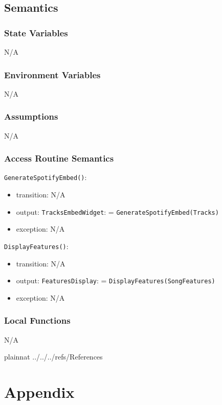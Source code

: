 \documentclass[12pt, titlepage]{article}
\begin{document}
\subsection{Semantics}

\subsubsection{State Variables}
N/A

\subsubsection{Environment Variables}
N/A

\subsubsection{Assumptions}
N/A

\subsubsection{Access Routine Semantics}

\noindent \texttt{GenerateSpotifyEmbed()}:
\begin{itemize}
\item transition: N/A
\item output: \texttt{Tracks\textunderscore Embed\textunderscore Widget}: = \texttt{GenerateSpotifyEmbed(Tracks)}
\item exception: N/A
\end{itemize}

\noindent \texttt{DisplayFeatures()}:
\begin{itemize}
\item transition: N/A
\item output: \texttt{Features\textunderscore Display}: = \texttt{DisplayFeatures(Song\textunderscore Features)}
\item exception: N/A
\end{itemize}

\subsubsection{Local Functions}
N/A

\newpage

 {plainnat}
 {../../../refs/References}

\newpage

\section{Appendix} \label{Appendix}
\end{document}
